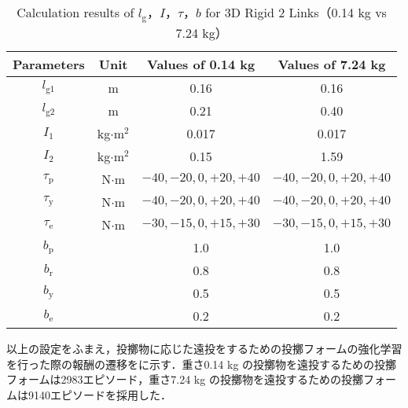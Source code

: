 \begin{table}[tb]
  \begin{center}
    \caption{Calculation results of $l_{\mathrm{g}}$，$I$，$\tau$，$b$ for 3D Rigid 2 Links（0.14 kg vs 7.24 kg）}
    \begin{tabular}{c|c|c|c}
      \hline
      Parameters & Unit & Values of 0.14 kg & Values of 7.24 kg \\
      \hline
      $l_{\mathrm{g1}}$ & m & 0.16 & 0.16 \\
      $l_{\mathrm{g2}}$ & m & 0.21 & 0.40 \\
      $I_{1}$ & kg$\cdot$$\mathrm{m}^2$ & 0.017 & 0.017 \\
      $I_{2}$ & kg$\cdot$$\mathrm{m}^2$ & 0.15 & 1.59 \\
      $\tau_{\mathrm{p}}$ & N$\cdot$m & $-40, -20, 0, +20, +40$ & $-40, -20, 0, +20, +40$ \\
      $\tau_{\mathrm{y}}$ & N$\cdot$m & $-40, -20, 0, +20, +40$ & $-40, -20, 0, +20, +40$ \\
      $\tau_{\mathrm{e}}$ & N$\cdot$m & $-30, -15, 0, +15, +30$ & $-30, -15, 0, +15, +30$ \\
      $b_{\mathrm{p}}$ &  & 1.0 & 1.0\\
      $b_{\mathrm{r}}$ &  & 0.8 & 0.8\\
      $b_{\mathrm{y}}$ &  & 0.5 & 0.5\\
      $b_{\mathrm{e}}$ &  & 0.2 & 0.2\\
      \hline
    \end{tabular}
  \end{center}
\end{table}

以上の設定をふまえ，投擲物に応じた遠投をするための投擲フォームの強化学習を行った際の報酬の遷移をに示す．重さ0.14 kg の投擲物を遠投するための投擲フォームは2983エピソード，重さ7.24 kg の投擲物を遠投するための投擲フォームは9140エピソードを採用した．


